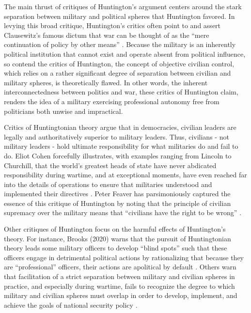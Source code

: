 \documentclass[
  12pt,
  oneside]{memoir}
\begin{document}
The main thrust of critiques of Huntington's argument centers around the stark separation between military and political spheres that Huntington favored. In levying this broad critique, Huntington's critics often point to and assert Clausewitz's famous dictum that war can be thought of as the ``mere continuation of policy by other means'' \autocite[69, 605]{clausewitz_war_1976}. Because the military is an inherently political institution that cannot exist and operate absent from political influence, so contend the critics of Huntington, the concept of objective civilian control, which relies on a rather significant degree of separation between civilian and military spheres, is theoretically flawed. In other words, the inherent interconnectedness between politics and war, these critics of Huntington claim, renders the idea of a military exercising professional autonomy free from politicians both unwise and impractical.

Critics of Huntingtonian theory argue that in democracies, civilian leaders are legally and authoritatively superior to military leaders. Thus, civilians - not military leaders - hold ultimate responsibility for what militaries do and fail to do. Eliot Cohen forcefully illustrates, with examples ranging from Lincoln to Churchill, that the world's greatest heads of state have never abdicated responsibility during wartime, and at exceptional moments, have even reached far into the details of operations to ensure that militaries understood and implemented their directives \autocite{cohen_supreme_2003}. Peter Feaver has parsimoniously captured the essence of this critique of Huntington by noting that the principle of civilian supremacy over the military means that ``civilians have the right to be wrong'' \autocites[117]{feaver_right_2011}{feaver_armed_2003}.

Other critiques of Huntington focus on the harmful effects of Huntington's theory. For instance, Brooks (2020) warns that the pursuit of Huntingtonian theory leads some military officers to develop ``blind spots'' such that these officers engage in detrimental political actions by rationalizing that because they are ``professional'' officers, their actions are apolitical by default \autocite[17]{brooks_paradoxes_2020}. Others warn that facilitation of a strict separation between military and civilian spheres in practice, and especially during wartime, fails to recognize the degree to which military and civilian spheres must overlap in order to develop, implement, and achieve the goals of national security policy \autocite{rapp_civil-military_2015}.
\end{document}
